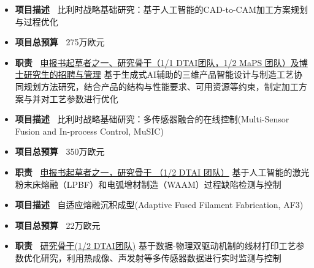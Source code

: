\documentclass{resume}
\begin{document}


\label{project:AutoCAM}
\begin{itemize}[parsep=0.5ex]
  \item \textbf{项目描述~} 比利时战略基础研究：基于人工智能的CAD-to-CAM加工方案规划与过程优化
  \item \textbf{项目总预算~} \SLASH275万欧元
  \item \textbf{职责~} \underline{申报书起草者之一、研究骨干（1/1 DTAI团队，1/2 MaPS 团队）及博士研究生的招聘与管理} 基于生成式AI辅助的三维产品智能设计与制造工艺协同规划方法研究，结合产品的结构与性能要求、可用资源等约束，制定加工方案与并对工艺参数进行优化
\end{itemize}

\label{project:MuSIC}
\begin{itemize}[parsep=0.5ex]
  \item \textbf{项目描述~} 比利时战略基础研究：多传感器融合的在线控制(Multi-Sensor Fusion and In-process Control, MuSIC)
  \item \textbf{项目总预算~} \SLASH350万欧元
  \item \textbf{职责~} \underline{申报书起草者之一，研究骨干 （1/2 DTAI 团队）} 基于人工智能的激光粉末床熔融（LPBF）和电弧增材制造（WAAM）过程缺陷检测与控制
\end{itemize}

\label{project:AF3}
\begin{itemize}[parsep=0.5ex]
  \item \textbf{项目描述~} 自适应熔融沉积成型(Adaptive Fused Filament Fabrication, AF3)
  \item \textbf{项目总预算~} \SLASH22万欧元
  \item \textbf{职责~} \underline{研究骨干(1/2 DTAI团队)} 基于数据-物理双驱动机制的线材打印工艺参数优化研究，利用热成像、声发射等多传感器数据进行实时监测与控制
\end{itemize}
\end{document}
